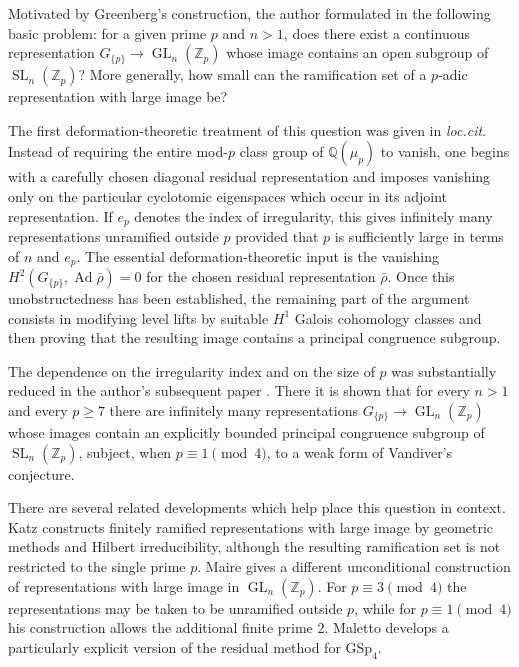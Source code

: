 \documentclass[11pt]{amsart}
\numberwithin{equation}{section}
\newcommand{\Q}{\mathbb Q}
\newcommand{\Zp}{\mathbb Z_p}
\newcommand{\Ad}{\operatorname{Ad}}
\newcommand{\SL}{\operatorname{SL}}
\newcommand{\GL}{\operatorname{GL}}
\theoremstyle{definition}
\begin{document}
\par Motivated by Greenberg's construction, the author formulated in
\cite{Ray2021} the following basic problem: for a given prime $p$ and
$n>1$, does there exist a continuous representation
$G_{\{p\}}\to\GL_n(\Zp)$ whose image contains an open subgroup of
$\SL_n(\Zp)$? More generally, how small can the ramification set of a
$p$-adic representation with large image be?

\par The first deformation-theoretic treatment of this question was given
in \emph{loc.cit}. Instead of requiring the entire mod-$p$ class group
of $\Q(\mu_p)$ to vanish, one begins with a carefully chosen diagonal
residual representation and imposes vanishing only on the particular
cyclotomic eigenspaces which occur in its adjoint representation. If
$e_p$ denotes the index of irregularity, this gives infinitely many
representations unramified outside $p$ provided that $p$ is
sufficiently large in terms of $n$ and $e_p$. The essential
deformation-theoretic input is the vanishing $H^2(G_{\{p\}},\Ad\bar\rho)=0$ for the chosen residual representation $\bar\rho$. Once this
unobstructedness has been established, the remaining part of the
argument consists in modifying level lifts
by suitable $H^1$ Galois cohomology classes and then proving that the resulting image
contains a principal congruence subgroup.

\par The dependence on the irregularity index and on the size of $p$ was
substantially reduced in the author's subsequent paper
\cite{Ray2023}. There it is shown that for every $n>1$ and every
$p\geq7$ there are infinitely many representations
$G_{\{p\}}\to\GL_n(\Zp)$ whose images contain an explicitly bounded
principal congruence subgroup of $\SL_n(\Zp)$, subject, when
$p\equiv1\pmod4$, to a weak form of Vandiver's conjecture.
\par There are several related developments which help place this question
in context. Katz \cite{Katz2019} constructs finitely ramified
representations with large image by geometric methods and Hilbert
irreducibility, although the resulting ramification set is not
restricted to the single prime $p$. Maire \cite{Maire2023} gives a
different unconditional construction of representations with large
image in $\GL_n(\Zp)$. For $p\equiv3\pmod4$ the representations may be
taken to be unramified outside $p$, while for
$p\equiv1\pmod4$ his construction allows the additional finite prime
$2$. Maletto \cite{Maletto2023} develops a particularly explicit
version of the residual method for $\mathrm{GSp}_4$.
\end{document}

